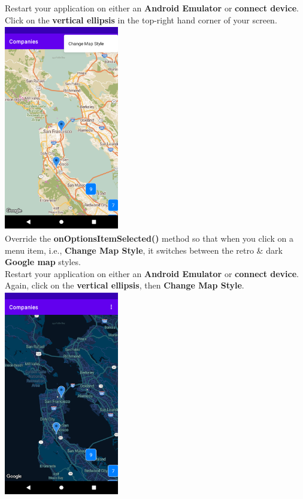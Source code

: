 \documentclass{article}
\begin{document}
Restart your application on either an \textbf{Android Emulator} or \textbf{connect device}. Click on the \textbf{vertical ellipsis} in the top-right hand corner of your screen. \\ 

\includegraphics[width=5cm, height=9cm]{../tex/img/practicals/05-companies-4.png}  \\

Override the \textbf{onOptionsItemSelected()} method so that when you click on a menu item, i.e., \textbf{Change Map Style}, it switches between the retro \& dark \textbf{Google map} styles. \\

Restart your application on either an \textbf{Android Emulator} or \textbf{connect device}. Again, click on the \textbf{vertical ellipsis}, then \textbf{Change Map Style}. \\ 

\includegraphics[width=5cm, height=9cm]{../tex/img/practicals/05-companies-5.png} 
\end{document}
